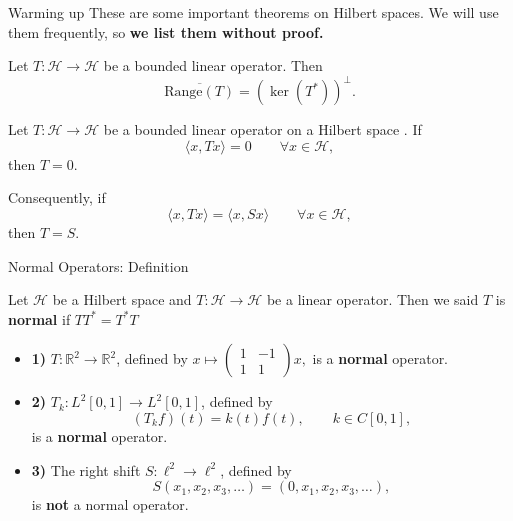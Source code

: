 \documentclass[9pt, aspectratio=169]{beamer}
\begin{document}
\begin{frame}{Warming up}
These are some important theorems on Hilbert spaces. We will use them frequently, so \textbf{we list them without proof.}
\pause
\begin{tcolorbox}[colback=blue!5, colframe=blue!20!orange, title=Theorem 0.1]
Let $T:\mathcal{H}\to\mathcal{H}$ be a bounded linear operator. Then
\[
\overline{\mathrm{Range}(T)}=(\ker(T^*))^{\perp}.
\]
\end{tcolorbox}
\pause
\begin{tcolorbox}[colback=blue!5, colframe=blue!20!orange, title=Theorem 0.2]
Let $T:\mathcal{H}\to\mathcal{H}$ be a bounded linear operator on a Hilbert space . If
\[
\langle x,Tx\rangle=0 \qquad \forall x\in\mathcal{H},
\]
then $T=0$.

Consequently, if
\[
\langle x,Tx\rangle=\langle x,Sx\rangle \qquad \forall x\in\mathcal{H},
\]
then $T=S$.
\end{tcolorbox}
\end{frame}
\begin{frame}{Normal Operators: Definition}
  \begin{definition}
      Let $\mathcal{H}$ be a Hilbert space and $T: \mathcal{H} \rightarrow \mathcal{H}$ be a linear operator. Then we said $T$ is \textbf{normal} if $TT^*=T^*T$
  \end{definition} 
  
  \pause

 \begin{example}[1]
\begin{itemize}
    \item \textbf{1)} $T:\mathbb{R}^{2}\to\mathbb{R}^{2}$, defined by
    $
    x\mapsto
    \begin{pmatrix}
    1 & -1\\
    1 & 1
    \end{pmatrix}x,
    $
    is a \textbf{normal} operator.
\pause
    \item \textbf{2)} $T_k:L^2[0,1]\to L^2[0,1]$, defined by
    \[
    (T_kf)(t)=k(t)f(t), \qquad k\in C[0,1],
    \]
    is a \textbf{normal} operator.
\pause
    \item \textbf{3)} The right shift $S:\ell^2\to\ell^2$, defined by
    \[
    S(x_1,x_2,x_3,\dots)=(0,x_1,x_2,x_3,\dots),
    \]
    is \textbf{not} a normal operator.
\end{itemize}
\end{example}


\end{frame}
\end{document}
